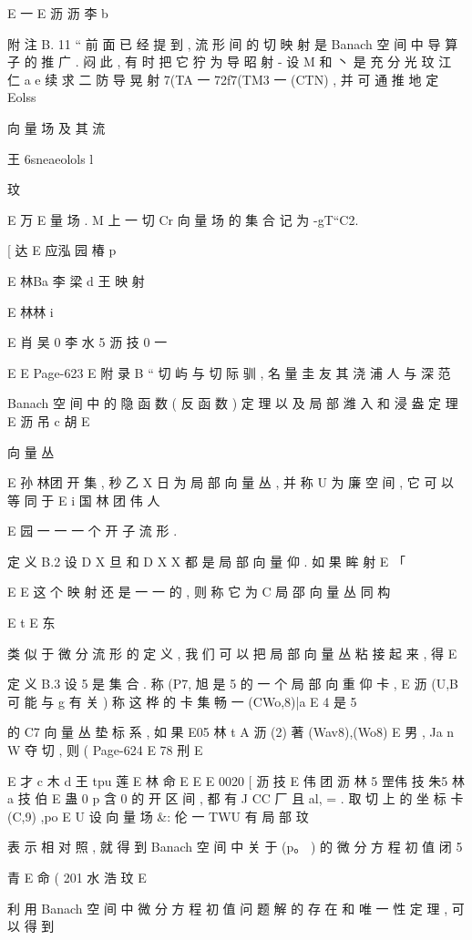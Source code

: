 E 一
E 沥 沥 李 b

附 注 B. 11 “ 前 面 已 经 提 到 , 流 形 间 的 切 映 射 是 Banach 空 间
中 导 算 子 的 推 广 . 闷 此 , 有 时 把 它 狞 为 导 昭 射 - 设 M 和 丶 是 充 分 光
玟
江 仁 a e
续 求 二 防 导 晃 射 7(TA 一 72f7(TM3 一 (CTN) , 并 可 通 推 地 定
Eolss

向 量 场 及 其 流

王
6sneaeolols l

玟

E 万
E
量 场 . M 上 一 切 Cr 向 量 场 的 集 合 记 为 -gT“C2.

[ 达
E 应泓
园
椿 p

E 林Ba 李 梁 d
王
映 射

E 林林 i

E 肖 吴 0 李 水 5 沥 技 0 一

E
E
Page-623
E 附 录 B “ 切 屿 与 切 际 驯 , 名 量 圭 友 其 浇 浦 人 与 深 范

Banach 空 间 中 的 隐 函 数 ( 反 函 数 ) 定 理 以 及 局 部 潍 入 和 浸 盎 定 理
E 沥 吊 c 胡
E

向 量 丛

E 孙 林团
开 集 , 秒 乙 X 日 为 局 部 向 量 丛 , 并 称 U 为 廉 空 间 , 它 可 以 等 同 于
E i 国 林
团 伟
人

E 园 一 一
一 个 开 子 流 形 .

定 义 B.2 设 D X 旦 和 D X X 都 是 局 部 向 量 仰 . 如 果 眸 射
E 「

E
E
这 个 映 射 还 是 一 一 的 , 则 称 它 为 C 局 邵 向 量 丛 同 构

E
t
E 东

类 似 于 微 分 流 形 的 定 义 , 我 们 可 以 把 局 部 向 量 丛 粘 接 起 来 , 得
E

定 义 B.3 设 5 是 集 合 . 称 (P7, 旭 是 5 的 一 个 局 部 向 重 仰 卡 ,
E 沥
(U,B 可 能 与 g 有 关 ) 称 这 桦 的 卡 集 畅 一 (CWo,8)|a E 4 是 5

的 C7 向 量 丛 垫 标 系 , 如 果
E05 林 t A 沥
(2) 著 (Wav8),(Wo8) E 男 , Ja n W 夺 切 , 则 (
Page-624
E 78 刑 E

E 才 c 木
d 王 tpu 莲 E 林 命
E
E
E 0020 [ 沥
技
E 伟 团 沥 林 5 罡伟 技
朱5 林 a 技 伯
E
蛊 0
p
含 0 的 开 区 间 , 都 有 J CC 厂 且 al, = .
取 切 上 的 坐 标 卡 (C,9) ,po E U 设 向 量 场 &: 伦 一 TWU 有 局 部
玟

表 示 相 对 照 , 就 得 到 Banach 空 间 中 关 于 (p。 ) 的 微 分 方 程 初 值 闭
5

青 E
命 ( 201 水
浩
玟
E

利 用 Banach 空 间 中 微 分 方 程 初 值 问 题 解 的 存 在 和 唯 一 性 定
理 , 可 以 得 到

